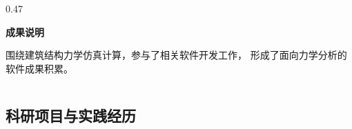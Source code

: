 \documentclass[notheorems]{beamer}
\begin{document}
\begin{frame}
\begin{columns}[T, totalwidth=\linewidth]
\begin{column}{0.47\linewidth}
\begin{tcolorbox}
					{\fontsize{7}{10}\selectfont\sffamily\bfseries 成果说明\par}
					\vspace{2pt}
					{\fontsize{7}{10.5}\selectfont\sffamily
						围绕建筑结构力学仿真计算，参与了相关软件开发工作，%
						形成了面向力学分析的软件成果积累。\par}
					
				\end{tcolorbox}
			\end{column}
			
		\end{columns}
		
	\end{frame}
	
	\subsection{科研项目与实践经历}
	
\end{document}
